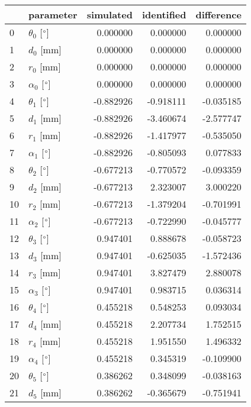 \documentclass{standalone}%
\begin{document}
%
\normalsize%
\begin{tabular}{llrrr}
\toprule
{} &                 parameter & simulated & identified & difference \\
\midrule
0  &  $\theta_{0}$ [$\degree$] &  0.000000 &   0.000000 &   0.000000 \\
1  &              $d_{0}$ [mm] &  0.000000 &   0.000000 &   0.000000 \\
2  &              $r_{0}$ [mm] &  0.000000 &   0.000000 &   0.000000 \\
3  &  $\alpha_{0}$ [$\degree$] &  0.000000 &   0.000000 &   0.000000 \\
4  &  $\theta_{1}$ [$\degree$] & -0.882926 &  -0.918111 &  -0.035185 \\
5  &              $d_{1}$ [mm] & -0.882926 &  -3.460674 &  -2.577747 \\
6  &              $r_{1}$ [mm] & -0.882926 &  -1.417977 &  -0.535050 \\
7  &  $\alpha_{1}$ [$\degree$] & -0.882926 &  -0.805093 &   0.077833 \\
8  &  $\theta_{2}$ [$\degree$] & -0.677213 &  -0.770572 &  -0.093359 \\
9  &              $d_{2}$ [mm] & -0.677213 &   2.323007 &   3.000220 \\
10 &              $r_{2}$ [mm] & -0.677213 &  -1.379204 &  -0.701991 \\
11 &  $\alpha_{2}$ [$\degree$] & -0.677213 &  -0.722990 &  -0.045777 \\
12 &  $\theta_{3}$ [$\degree$] &  0.947401 &   0.888678 &  -0.058723 \\
13 &              $d_{3}$ [mm] &  0.947401 &  -0.625035 &  -1.572436 \\
14 &              $r_{3}$ [mm] &  0.947401 &   3.827479 &   2.880078 \\
15 &  $\alpha_{3}$ [$\degree$] &  0.947401 &   0.983715 &   0.036314 \\
16 &  $\theta_{4}$ [$\degree$] &  0.455218 &   0.548253 &   0.093034 \\
17 &              $d_{4}$ [mm] &  0.455218 &   2.207734 &   1.752515 \\
18 &              $r_{4}$ [mm] &  0.455218 &   1.951550 &   1.496332 \\
19 &  $\alpha_{4}$ [$\degree$] &  0.455218 &   0.345319 &  -0.109900 \\
20 &  $\theta_{5}$ [$\degree$] &  0.386262 &   0.348099 &  -0.038163 \\
21 &              $d_{5}$ [mm] &  0.386262 &  -0.365679 &  -0.751941 \\

\end{tabular}
\end{document}
